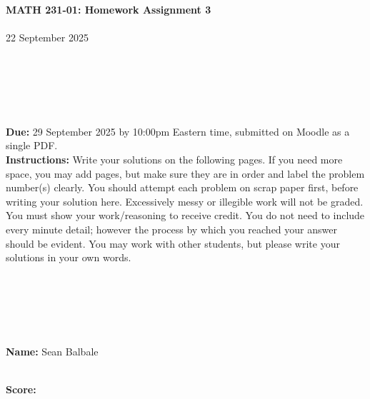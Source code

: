 \documentclass[reqno, 12pt]{amsart}
\begin{document}
\begin{center}
{\bf MATH 231-01: Homework Assignment 3}\\~\\
22 September 2025\\~\\~\\~\\~\\~\\
\end{center}

{\bf Due:} 29 September 2025 by 10:00pm Eastern time, submitted on Moodle as a single PDF.~\\


{\bf Instructions:} Write your solutions on the following pages. If you need more space, you may add pages, but make sure they are in order and label the problem number(s) clearly. You should attempt each problem on scrap paper first, before writing your solution here. Excessively messy or illegible work will not be graded. You must show your work/reasoning to receive credit. You do not need to include every minute detail; however the process by which you reached your answer should be evident. You may work with other students, but please write your solutions in your own words.

~\\~\\~\\~\\~\\
{\bf Name:} Sean Balbale

~\\
{\bf Score:}
\end{document}
